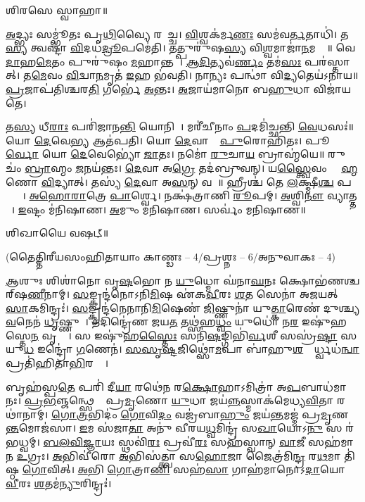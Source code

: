 𑌶𑌿𑌰𑌸𑍇 𑌸𑍍𑌵𑌾𑌹𑌾॥

{\small \closesection}


\ul{𑌅}𑌦𑍍𑌭𑍍𑌯𑌃 𑌸𑌮𑍍𑌭𑍂॑𑌤𑌃 𑌪𑍃\ul{𑌥𑌿}𑌵𑍍𑌯𑍈 𑌰𑌸𑌾᳚𑌚𑍍𑌚। \ul{𑌵𑌿}𑌶𑍍𑌵𑌕॑𑌰𑍍𑌮\ul{𑌣𑌃} 𑌸𑌮॑𑌵\ul{𑌰𑍍𑌤}𑌤𑌾𑌧𑌿॑। 𑌤\ul{𑌸𑍍𑌯} 𑌤𑍍𑌵𑌷𑍍𑌟𑌾॑ \ul{𑌵𑌿}𑌦𑌧॑\ul{𑌦𑍍𑌰𑍂}𑌪𑌮𑍇॑𑌤𑌿। 𑌤𑌤𑍍𑌪𑍁𑌰𑍁॑𑌷\ul{𑌸𑍍𑌯} 𑌵𑌿\ul{𑌶𑍍𑌵}𑌮𑌾𑌜𑌾॑\ul{𑌨}𑌮𑌗𑍍𑌰𑍇᳚॥ 𑌵𑍇\ul{𑌦𑌾}𑌹\ul{𑌮𑍇}𑌤𑌂 𑌪𑍁𑌰𑍁॑𑌷𑌂 \ul{𑌮}𑌹𑌾𑌨𑍍𑌤𑌮𑍍᳚। \ul{𑌆}\ul{𑌦𑌿}𑌤𑍍𑌯𑌵॑\ul{𑌰𑍍𑌣𑌂} 𑌤𑌮॑\ul{𑌸𑌃} 𑌪𑌰॑𑌸𑍍𑌤𑌾𑌤𑍍। 𑌤\ul{𑌮𑍇}𑌵𑌂 \ul{𑌵𑌿}𑌦𑍍𑌵𑌾\ul{𑌨}𑌮𑍃𑌤॑ \ul{𑌇}𑌹 𑌭॑𑌵𑌤𑌿। 𑌨𑌾𑌨𑍍𑌯𑌃 𑌪𑌨𑍍𑌥𑌾॑ 𑌵𑌿\ul{𑌦𑍍𑌯}𑌤𑍇𑌯॑𑌽𑌨𑌾𑌯॥ \ul{𑌪𑍍𑌰}𑌜𑌾𑌪॑𑌤𑌿𑌶𑍍𑌚𑌰\ul{𑌤𑌿} 𑌗𑌰𑍍𑌭𑍇॑ \ul{𑌅}𑌨𑍍𑌤𑌃। \ul{𑌅}𑌜𑌾𑌯॑𑌮𑌾𑌨𑍋 𑌬\ul{𑌹𑍁}𑌧𑌾 𑌵𑌿𑌜𑌾॑𑌯𑌤𑍇। 

𑌤\ul{𑌸𑍍𑌯} 𑌧𑍀\ul{𑌰𑌾𑌃} 𑌪𑌰𑌿॑𑌜𑌾𑌨\ul{𑌨𑍍𑌤𑌿} 𑌯𑍋𑌨𑌿𑌮𑍍᳚। 𑌮𑌰𑍀॑𑌚𑍀𑌨𑌾𑌂 \ul{𑌪}𑌦𑌮𑌿॑𑌚𑍍𑌛𑌨𑍍𑌤𑌿 \ul{𑌵𑍇}𑌧𑌸𑌃॑॥ 𑌯𑍋 \ul{𑌦𑍇}𑌵𑍇\ul{𑌭𑍍𑌯} 𑌆𑌤॑𑌪𑌤𑌿। 𑌯𑍋 \ul{𑌦𑍇}𑌵𑌾𑌨𑌾𑌂᳚ \ul{𑌪𑍁}𑌰𑍋𑌹𑌿॑𑌤𑌃। 𑌪𑍂\ul{𑌰𑍍𑌵𑍋} 𑌯𑍋 \ul{𑌦𑍇}𑌵𑍇𑌭𑍍𑌯𑍋॑ \ul{𑌜𑌾}𑌤𑌃। 𑌨𑌮𑍋॑ \ul{𑌰𑍁}𑌚𑌾\ul{𑌯} 𑌬𑍍𑌰𑌾𑌹𑍍𑌮॑𑌯𑍇॥ 𑌰𑍁𑌚𑌂॑ \ul{𑌬𑍍𑌰𑌾}𑌹𑍍𑌮𑌂 \ul{𑌜}𑌨𑌯॑𑌨𑍍𑌤𑌃। \ul{𑌦𑍇}𑌵𑌾 𑌅\ul{𑌗𑍍𑌰𑍇} 𑌤𑌦॑𑌬𑍍𑌰𑍁𑌵𑌨𑍍। 𑌯\ul{𑌸𑍍𑌤𑍍𑌵𑍈}𑌵𑌂 𑌬𑍍𑌰𑌾᳚\ul{𑌹𑍍𑌮}𑌣𑍋 \ul{𑌵𑌿}𑌦𑍍𑌯𑌾𑌤𑍍। 𑌤𑌸𑍍𑌯॑ \ul{𑌦𑍇}𑌵𑌾 𑌅\ul{𑌸}𑌨𑍍 𑌵𑌶𑍇᳚॥ 𑌹𑍍𑌰𑍀𑌶𑍍𑌚॑ 𑌤𑍇 \ul{𑌲}𑌕𑍍𑌷𑍍𑌮𑍀\ul{𑌶𑍍𑌚} 𑌪𑌤𑍍𑌨𑍍𑌯𑍗᳚। \ul{𑌅}\ul{𑌹𑍋}\ul{𑌰𑌾}𑌤𑍍𑌰𑍇 \ul{𑌪𑌾}𑌰𑍍𑌶𑍍𑌵𑍇। 𑌨𑌕𑍍𑌷॑𑌤𑍍𑌰𑌾𑌣𑌿 \ul{𑌰𑍂}𑌪𑌮𑍍। \ul{𑌅}𑌶𑍍𑌵𑌿\ul{𑌨𑍗} 𑌵𑍍𑌯𑌾𑌤𑍍𑌤𑌮𑍍᳚। \ul{𑌇}𑌷𑍍𑌟𑌂 𑌮॑𑌨𑌿𑌷𑌾𑌣। \ul{𑌅}𑌮𑍁𑌂 𑌮॑𑌨𑌿𑌷𑌾𑌣। 𑌸𑌰𑍍𑌵𑌂॑ 𑌮𑌨𑌿𑌷𑌾𑌣॥ 

𑌶𑌿𑌖𑌾𑌯𑍈 𑌵𑌷𑌟𑍍॥

{\small \closesection}
\centerline{\normalsize (𑌤𑍈𑌤𑍍𑌤𑌿𑌰𑍀𑌯𑌸𑌂𑌹𑌿𑌤𑌾𑌯𑌾𑌂 𑌕𑌾𑌣𑍍𑌡𑌃 – 4/𑌪𑍍𑌰𑌶𑍍𑌨𑌃 – 6/𑌅𑌨𑍁𑌵𑌾𑌕𑌃 – 4)}

\ul{𑌆}𑌶𑍁𑌃 𑌶𑌿𑌶𑌾॑𑌨𑍋 𑌵𑍃\ul{𑌷}𑌭𑍋 𑌨 \ul{𑌯𑍁}𑌧𑍍𑌮𑍋 𑌘॑𑌨𑌾\ul{𑌘}𑌨𑌃 𑌕𑍍𑌷𑍋𑌭॑𑌣𑌶𑍍𑌚𑌰𑍍‌𑌷\ul{𑌣𑍀}𑌨𑌾𑌮𑍍। \ul{𑌸}𑌙𑍍𑌕𑍍𑌰𑌨𑍍𑌦॑𑌨𑍋𑌽𑌨𑌿\ul{𑌮𑌿}𑌷 𑌏॑𑌕\ul{𑌵𑍀}𑌰𑌃 \ul{𑌶}𑌤 𑌸𑍇𑌨𑌾॑ 𑌅𑌜𑌯𑌤𑍍 \ul{𑌸𑌾}𑌕𑌮𑌿𑌨𑍍𑌦𑍍𑌰𑌃॑। \ul{𑌸}𑌙𑍍𑌕𑍍𑌰𑌨𑍍𑌦॑𑌨𑍇𑌨𑌾𑌨𑌿\ul{𑌮𑌿}𑌷𑍇𑌣॑ \ul{𑌜𑌿}𑌷𑍍𑌣𑍁𑌨𑌾॑ 𑌯𑍁\ul{𑌤𑍍𑌕𑌾}𑌰𑍇𑌣॑ 𑌦𑍁𑌶𑍍𑌚𑍍𑌯\ul{𑌵}𑌨𑍇𑌨॑ \ul{𑌧𑍃}𑌷𑍍𑌣𑍁𑌨𑌾᳚। 𑌤𑌦𑌿𑌨𑍍𑌦𑍍𑌰𑍇॑𑌣 𑌜𑌯\ul{𑌤} 𑌤𑌥𑍍𑌸॑𑌹\ul{𑌧𑍍𑌵𑌂} 𑌯𑍁𑌧𑍋॑ 𑌨\ul{𑌰} 𑌇𑌷𑍁॑𑌹𑌸𑍍𑌤𑍇\ul{𑌨} 𑌵𑍃𑌷𑍍𑌣𑌾᳚। 𑌸 𑌇𑌷𑍁॑𑌹\ul{𑌸𑍍𑌤𑍈𑌃} 𑌸𑌨𑌿॑\ul{𑌷}𑌙𑍍𑌗𑌿𑌭𑌿॑\ul{𑌰𑍍𑌵}𑌶𑍀 𑌸𑌸𑍍𑌰॑\ul{𑌷𑍍𑌟𑌾} 𑌸 𑌯𑍁\ul{𑌧} 𑌇𑌨𑍍𑌦𑍍𑌰𑍋॑ \ul{𑌗}𑌣𑍇𑌨॑। \ul{𑌸}\ul{}\ul{𑌸𑍃}\ul{𑌷𑍍𑌟}𑌜𑌿𑌥𑍍𑌸𑍋॑\ul{𑌮}𑌪𑌾 𑌬𑌾॑𑌹𑍁\ul{𑌶}𑌧𑍍𑌯𑍂᳚𑌰𑍍𑌧𑍍𑌵𑌧॑\ul{𑌨𑍍𑌵𑌾} 𑌪𑍍𑌰𑌤𑌿॑𑌹𑌿𑌤𑌾\ul{𑌭𑌿}𑌰𑌸𑍍𑌤𑌾᳚।

𑌬𑍃𑌹॑𑌸𑍍𑌪\ul{𑌤𑍇} 𑌪𑌰𑌿॑ 𑌦𑍀\ul{𑌯𑌾} 𑌰𑌥𑍇॑𑌨 𑌰\ul{𑌕𑍍𑌷𑍋}𑌹𑌾𑌽𑌮𑌿𑌤𑍍𑌰𑌾॑ 𑌅\ul{𑌪}𑌬𑌾𑌧॑𑌮𑌾𑌨𑌃। \ul{𑌪𑍍𑌰}\ul{𑌭}𑌞𑍍𑌜𑌨𑍍𑌥𑍍𑌸𑍇𑌨𑌾𑌃᳚ 𑌪𑍍𑌰\ul{𑌮𑍃}𑌣𑍋 \ul{𑌯𑍁}𑌧𑌾 𑌜𑌯॑\ul{𑌨𑍍𑌨}𑌸𑍍𑌮𑌾𑌕॑𑌮𑍇𑌧𑍍𑌯\ul{𑌵𑌿}𑌤𑌾 𑌰𑌥𑌾॑𑌨𑌾𑌮𑍍। \ul{𑌗𑍋}\ul{𑌤𑍍𑌰}𑌭𑌿𑌦𑌂॑ \ul{𑌗𑍋}𑌵𑌿\ul{𑌦𑌂} 𑌵𑌜𑍍𑌰॑𑌬𑌾\ul{𑌹𑍁𑌂} 𑌜𑌯॑\ul{𑌨𑍍𑌤}𑌮𑌜𑍍𑌮॑ 𑌪𑍍𑌰\ul{𑌮𑍃}𑌣\ul{𑌨𑍍𑌤}𑌮𑍋𑌜॑𑌸𑌾। \ul{𑌇}𑌮 𑌸॑𑌜𑌾\ul{𑌤𑌾} 𑌅𑌨𑍁॑ 𑌵𑍀𑌰𑌯\ul{𑌧𑍍𑌵}𑌮𑌿𑌨𑍍𑌦𑍍𑌰॑ 𑌸\ul{𑌖𑌾}𑌯𑍋𑌽\ul{𑌨𑍁} 𑌸 𑌰॑𑌭𑌧𑍍𑌵𑌮𑍍। \ul{𑌬}\ul{𑌲}\ul{𑌵𑌿}\ul{𑌜𑍍𑌞𑌾}𑌯𑌃 𑌸𑍍𑌥𑌵𑌿॑\ul{𑌰𑌃} 𑌪𑍍𑌰𑌵𑍀॑\ul{𑌰𑌃} 𑌸𑌹॑𑌸𑍍𑌵𑌾𑌨𑍍 \ul{𑌵𑌾}𑌜𑍀 𑌸𑌹॑𑌮𑌾𑌨 \ul{𑌉}𑌗𑍍𑌰𑌃। \ul{𑌅}𑌭𑌿𑌵𑍀॑𑌰𑍋 \ul{𑌅}𑌭𑌿𑌸॑𑌤𑍍𑌤𑍍𑌵𑌾 𑌸\ul{𑌹𑍋}𑌜𑌾 𑌜𑍈𑌤𑍍𑌰॑𑌮𑌿\ul{𑌨𑍍𑌦𑍍𑌰} 𑌰\ul{𑌥}𑌮𑌾 𑌤𑌿॑𑌷𑍍𑌠 \ul{𑌗𑍋}𑌵𑌿𑌤𑍍। \ul{𑌅}𑌭𑌿 \ul{𑌗𑍋}𑌤𑍍𑌰𑌾\ul{𑌣𑌿} 𑌸𑌹॑\ul{𑌸𑌾} 𑌗𑌾𑌹॑𑌮𑌾𑌨𑍋𑌽\ul{𑌦𑌾}𑌯𑍋 \ul{𑌵𑍀}𑌰𑌃 \ul{𑌶}𑌤𑌮॑\ul{𑌨𑍍𑌯𑍁}𑌰𑌿𑌨𑍍𑌦𑍍𑌰𑌃॑।


